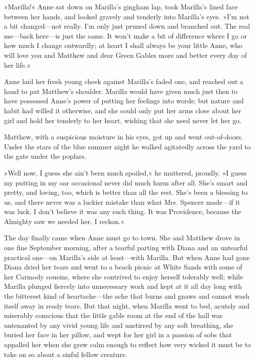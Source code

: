 »Marilla!« Anne sat down on Marilla’s gingham lap, took Marilla’s lined face between her hands, and looked gravely and tenderly into Marilla’s eyes. »I’m not a bit changed—not really. I’m only just pruned down and branched out. The real me—back here—is just the same. It won’t make a bit of difference where I go or how much I change outwardly; at heart I shall always be your little Anne, who will love you and Matthew and dear Green Gables more and better every day of her life.«

Anne laid her fresh young cheek against Marilla’s faded one, and reached out a hand to pat Matthew’s shoulder. Marilla would have given much just then to have possessed Anne’s power of putting her feelings into words; but nature and habit had willed it otherwise, and she could only put her arms close about her girl and hold her tenderly to her heart, wishing that she need never let her go.

Matthew, with a suspicious moisture in his eyes, got up and went out-of-doors. Under the stars of the blue summer night he walked agitatedly across the yard to the gate under the poplars.

»Well now, I guess she ain’t been much spoiled,« he muttered, proudly. »I guess my putting in my oar occasional never did much harm after all. She’s smart and pretty, and loving, too, which is better than all the rest. She’s been a blessing to us, and there never was a luckier mistake than what Mrs. Spencer made—if it was luck. I don’t believe it was any such thing. It was Providence, because the Almighty saw we needed her, I reckon.«

The day finally came when Anne must go to town. She and Matthew drove in one fine September morning, after a tearful parting with Diana and an untearful practical one—on Marilla’s side at least—with Marilla. But when Anne had gone Diana dried her tears and went to a beach picnic at White Sands with some of her Carmody cousins, where she contrived to enjoy herself tolerably well; while Marilla plunged fiercely into unnecessary work and kept at it all day long with the bitterest kind of heartache—the ache that burns and gnaws and cannot wash itself away in ready tears. But that night, when Marilla went to bed, acutely and miserably conscious that the little gable room at the end of the hall was untenanted by any vivid young life and unstirred by any soft breathing, she buried her face in her pillow, and wept for her girl in a passion of sobs that appalled her when she grew calm enough to reflect how very wicked it must be to take on so about a sinful fellow creature.

